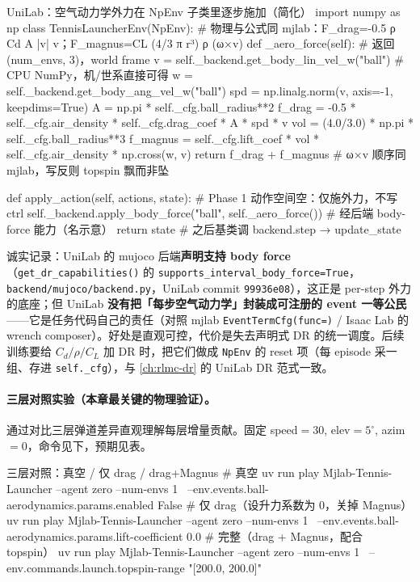\begin{codebox}[Python]{UniLab：空气动力学外力在 NpEnv 子类里逐步施加（简化）}
import numpy as np
class TennisLauncherEnv(NpEnv):
    # 物理与公式同 mjlab：F_drag=-0.5 ρ Cd A |v| v；F_magnus=CL (4/3 π r³) ρ (ω×v)
    def _aero_force(self):                     # 返回 (num_envs, 3)，world frame
        v   = self._backend.get_body_lin_vel_w("ball")    # CPU NumPy，机/世系直接可得
        w   = self._backend.get_body_ang_vel_w("ball")
        spd = np.linalg.norm(v, axis=-1, keepdims=True)
        A   = np.pi * self._cfg.ball_radius**2
        f_drag   = -0.5 * self._cfg.air_density * self._cfg.drag_coef * A * spd * v
        vol      = (4.0/3.0) * np.pi * self._cfg.ball_radius**3
        f_magnus = self._cfg.lift_coef * vol * self._cfg.air_density * np.cross(w, v)
        return f_drag + f_magnus               # ω×v 顺序同 mjlab，写反则 topspin 飘而非坠

    def apply_action(self, actions, state):    # Phase 1 动作空间空：仅施外力，不写 ctrl
        self._backend.apply_body_force("ball", self._aero_force())  # 经后端 body-force 能力（名示意）
        return state                           # 之后基类调 backend.step → update_state
\end{codebox}

诚实记录：UniLab 的 mujoco 后端\textbf{声明支持 body force}（\verb|get_dr_capabilities()| 的 \verb|supports_interval_body_force=True|，\verb|backend/mujoco/backend.py|，UniLab commit \texttt{99936e08}），这正是 per-step 外力的底座；但 UniLab \textbf{没有把「每步空气动力学」封装成可注册的 event 一等公民}——它是任务代码自己的责任（对照 mjlab \verb|EventTermCfg(func=)| / Isaac Lab 的 wrench composer）。好处是直观可控，代价是失去声明式 DR 的统一调度。后续训练要给 $C_d/\rho/C_L$ 加 DR 时，把它们做成 \verb|NpEnv| 的 reset 项（每 episode 采一组、存进 \verb|self._cfg|），与 \cref{ch:rlmc-dr} 的 UniLab DR 范式一致。

\paragraph{三层对照实验（本章最关键的物理验证）。}通过对比三层弹道差异直观理解每层增量贡献。固定 speed$=30$, elev$=5^\circ$, azim$=0$，命令见下，预期见表。

\begin{codebox}[bash]{三层对照：真空 / 仅 drag / drag+Magnus}
# 真空
uv run play Mjlab-Tennis-Launcher --agent zero --num-envs 1 \
  --env.events.ball-aerodynamics.params.enabled False
# 仅 drag（设升力系数为 0，关掉 Magnus）
uv run play Mjlab-Tennis-Launcher --agent zero --num-envs 1 \
  --env.events.ball-aerodynamics.params.lift-coefficient 0.0
# 完整（drag + Magnus，配合 topspin）
uv run play Mjlab-Tennis-Launcher --agent zero --num-envs 1 \
  --env.commands.launch.topspin-range "[200.0, 200.0]"
\end{codebox}

